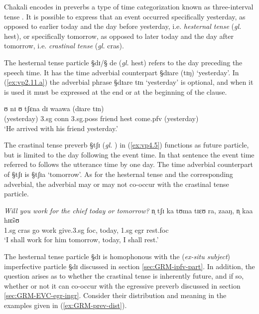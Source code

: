 Chakali encodes  in  preverbs  a type of
time categorization  known as three-interval tense  \citep[366]{Fraw92}. It is
possible to express that an event occurred specifically yesterday, as opposed to
earlier today and the day before yesterday, i.e. {\it hesternal tense}
({\it gl.} {\sc hest}), or specifically tomorrow, as opposed to later today and
the
day after tomorrow, i.e. {\it
crastinal tense}  ({\it gl.}  {\sc cras}). 

The hesternal tense particle {\S dɪ}/{\S
de} ({\it gl.} {\sc hest})  refers to the day
preceding the speech time.  It has the time adverbial counterpart  {\S dɪare
(tɪŋ)} `yesterday'.  In (\ref{ex:vp2.11.a}) the adverbial phrase {\S dɪare tɪn}
`yesterday' is optional,  and  when it is used it must be expressed at the end
or
at the beginning of
the clause.


\begin{exe} 
\ex\label{ex:vp2.11.a} 
 ʊ nɪ ʊ tʃɛna dɪ waawa  {(dɪare tɪn)}\\
{(yesterday)}    {\sc 3.sg} {\sc conn} {\sc 3.sg.poss} friend
{\sc hest}  come.{\sc pfv} {(yesterday)} \\ 
\glt  `He arrived with his friend yesterday.'
 \end{exe}


The crastinal tense preverb {\S tʃɪ} ({\it gl.} {\cras})  in  (\ref{ex:vp4.5})
functions as future particle,  but is limited to the day following the event
time.
In that sentence the event time referred to follows  the utterance
time by one day.  The time
adverbial counterpart  of {\S tʃɪ} is {\S  tʃɪa} `tomorrow'. As
for the hesternal tense and the corresponding adverbial,  the  adverbial may or
may not co-occur with the crastinal tense particle. 


\begin{exe} 
\ex\label{ex:vp4.5} {\it Will you work for the chief today or tomorrow?}
\gll  n̩ tʃɪ ka tʊma tɪɛʊ ra, zaaŋ,  n̩ kaa hɪɛ̃sʊ \\
    {\sc 1.sg} {\sc cras}  go  work give.{\sc 3.sg} {\sc foc},
today,   {\sc 1.sg}  {\sc egr} rest.{\sc foc} \\
\glt  `I shall work for
him tomorrow, today,  I shall rest.' 
 \end{exe}


The hesternal tense particle {\S dɪ} is homophonous with the ({\it ex-situ
subject}) imperfective particle  {\S dɪ} discussed in section
\ref{sec:GRM-ipfv-part}.  In addition, the question arises as to whether the
crastinal tense  is inherently future, and if so, whether or not it can
co-occur with the egressive preverb discussed in section
\ref{sec:GRM-EVC-egr-ingr}. Consider their distribution and meaning in the
examples given in (\ref{ex:GRM-prev-dist}).

